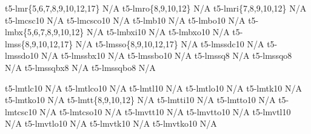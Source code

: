 \documentclass[test]{vnsample}
\begin{document}
\begin{shortsample}
       {t5-lmr\{5,6,7,8,9,10,12,17\}}  {N/A}
      {t5-lmro\{8,9,10,12\}}          {N/A}
      {t5-lmri\{7,8,9,10,12\}}        {N/A}
      {t5-lmcsc10}                    {N/A}
    {t5-lmcsco10}                   {N/A}
       {t5-lmb10}                      {N/A}
      {t5-lmbo10}                     {N/A}
      {t5-lmbx\{5,6,7,8,9,10,12\}}    {N/A}
     {t5-lmbxi10}                    {N/A}
     {t5-lmbxo10}                    {N/A}
      {t5-lmss\{8,9,10,12,17\}}       {N/A}
     {t5-lmsso\{8,9,10,12,17\}}      {N/A}
    {t5-lmssdc10}                   {N/A}
   {t5-lmssdo10}                   {N/A}
     {t5-lmssbx10}                   {N/A}
    {t5-lmssbo10}                   {N/A}
     {t5-lmssq8}                     {N/A}
    {t5-lmssqo8}                    {N/A}
    {t5-lmssqbx8}                   {N/A}
   {t5-lmssqbo8}                   {N/A}
\end{shortsample}
\clearpage
\begin{shortsample}
     {t5-lmtlc10}         {N/A}
    {t5-lmtlco10}        {N/A}
     {t5-lmtl10}          {N/A}
    {t5-lmtlo10}         {N/A}
     {t5-lmtk10}          {N/A}
    {t5-lmtko10}         {N/A}
      {t5-lmtt\{8,9,10,12\}}          {N/A}
     {t5-lmtti10}                    {N/A}
     {t5-lmtto10}                    {N/A}
     {t5-lmtcsc10}                   {N/A}
   {t5-lmtcso10}        {N/A}
     {t5-lmvtt10}                    {N/A}
    {t5-lmvtto10}                   {N/A}
    {t5-lmvtl10}         {N/A}
   {t5-lmvtlo10}        {N/A}
    {t5-lmvtk10}         {N/A}
   {t5-lmvtko10}        {N/A}
\end{shortsample}
\end{document}

